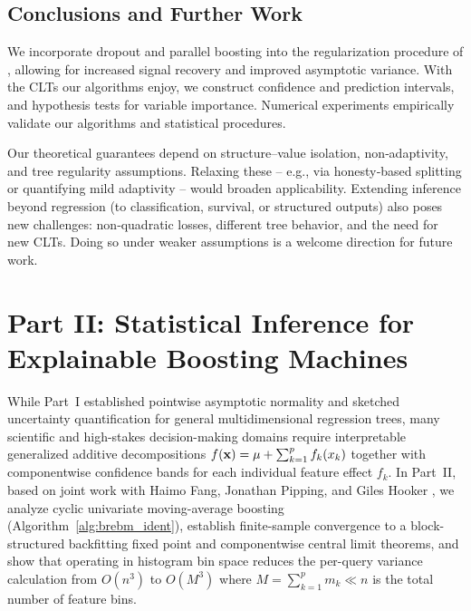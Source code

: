 \subsection{Conclusions and Further Work}
\label{sec:discussions}
We incorporate dropout and parallel boosting into the regularization procedure of \cite{zhou2022boulevard}, allowing for increased signal recovery and improved asymptotic variance. With the CLTs our algorithms enjoy, we construct confidence and prediction intervals, and hypothesis tests for variable importance. Numerical experiments empirically validate our algorithms and statistical procedures.

Our theoretical guarantees depend on structure--value isolation, non‑adaptivity, and tree regularity assumptions. Relaxing these -- e.g., via honesty‐based splitting or quantifying mild adaptivity -- would broaden applicability. Extending inference beyond regression (to classification, survival, or structured outputs) also poses new challenges: non‑quadratic losses, different tree behavior, and the need for new CLTs. Doing so under weaker assumptions is a welcome direction for future work. 




\section{Part II: Statistical Inference for Explainable Boosting Machines}
\label{sec:ch06-part2}

\begin{aigenblock}
While Part~I established pointwise asymptotic normality and sketched uncertainty quantification for general multidimensional regression trees, many scientific and high-stakes decision-making domains require interpretable generalized additive decompositions $f(\mathbf{x}) = \mu + \sum_{k=1}^p f_k(x_k)$ together with componentwise confidence bands for each individual feature effect $f_k$. In Part~II, based on joint work with Haimo Fang, Jonathan Pipping, and Giles Hooker \citep{fang2026statistical}, we analyze cyclic univariate moving-average boosting (Algorithm~\ref{alg:brebm_ident}), establish finite-sample convergence to a block-structured backfitting fixed point and componentwise central limit theorems, and show that operating in histogram bin space reduces the per-query variance calculation from $O(n^3)$ to $O(M^3)$ where $M = \sum_{k=1}^p m_k \ll n$ is the total number of feature bins.
\end{aigenblock}
